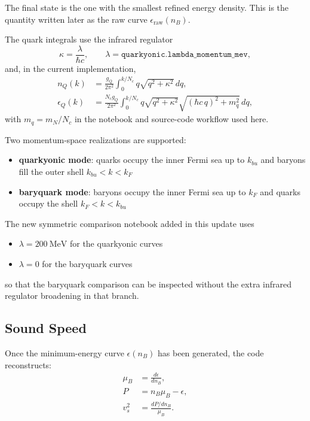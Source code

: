 \documentclass[11pt]{article}
\begin{document}
The final state is the one with the smallest refined energy density.  This is
the quantity written later as the raw curve $\epsilon_{\mathrm{raw}}(n_B)$.

The quark integrals use the infrared regulator
\begin{equation}
\kappa = \frac{\lambda}{\hbar c},
\qquad
\lambda = \texttt{quarkyonic.lambda\_momentum\_mev},
\end{equation}
and, in the current implementation,
\begin{align}
n_Q(k) &=
\frac{g_Q}{2\pi^2}
\int_0^{k/N_c} q \sqrt{q^2 + \kappa^2}\, dq,
\\
\epsilon_Q(k) &=
\frac{N_c g_Q}{2\pi^2}
\int_0^{k/N_c}
q \sqrt{q^2 + \kappa^2}
\sqrt{(\hbar c\,q)^2 + m_q^2}\, dq,
\end{align}
with $m_q = m_N/N_c$ in the notebook and source-code workflow used here.

Two momentum-space realizations are supported:
\begin{itemize}
\item \textbf{quarkyonic mode}: quarks occupy the inner Fermi sea up to
$k_{bu}$ and baryons fill the outer shell $k_{bu} < k < k_F$
\item \textbf{baryquark mode}: baryons occupy the inner Fermi sea up to $k_F$
and quarks occupy the shell $k_F < k < k_{bu}$
\end{itemize}

The new symmetric comparison notebook added in this update uses
\begin{itemize}
\item $\lambda = 200~\mathrm{MeV}$ for the quarkyonic curves
\item $\lambda = 0$ for the baryquark curves
\end{itemize}
so that the baryquark comparison can be inspected without the extra infrared
regulator broadening in that branch.

\subsection{Sound Speed}

Once the minimum-energy curve $\epsilon(n_B)$ has been generated, the code
reconstructs:
\begin{align}
\mu_B &= \frac{d\epsilon}{dn_B}, \\
P &= n_B \mu_B - \epsilon, \\
v_s^2 &= \frac{dP/dn_B}{\mu_B}.
\end{align}
\end{document}
